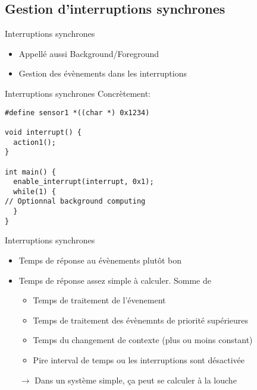 \subsection{Gestion d'interruptions synchrones} 

\begin{frame}{Interruptions synchrones}
  \begin{itemize} 
  \item Appellé aussi Background/Foreground
  \item Gestion des évènements dans les interruptions
  \end{itemize} 
  \begin{center}
  \end{center}
\end{frame}

\begin{frame}[fragile]{Interruptions synchrones}
  Concrètement:
  \begin{lstlisting}
#define sensor1 *((char *) 0x1234)

void interrupt() {
  action1();
}

int main() {
  enable_interrupt(interrupt, 0x1);
  while(1) {
// Optionnal background computing 
  }
}
  \end{lstlisting} 
\end{frame}

\begin{frame}{Interruptions synchrones}
  \begin{itemize} 
  \item Temps de réponse au évènements plutôt bon
  \item Temps de réponse assez simple à calculer. Somme de 
    \begin{itemize}
    \item Temps de traitement de l'évenement
    \item Temps de traitement des évènemnts de priorité supérieures
    \item Temps du changement de contexte (plus ou moins constant)
    \item Pire interval de temps ou les interruptions sont désactivée 
    \end{itemize} 
  \item[$\rightarrow$] Dans un système simple, ça peut se calculer à la louche
  \end{itemize} 
\end{frame} 

